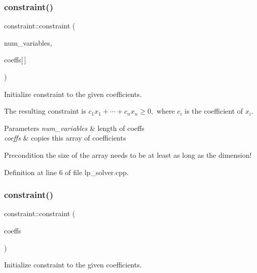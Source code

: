 \subsubsection{\texorpdfstring{constraint()}{constraint()}\hspace{0.1cm}{\footnotesize\ttfamily [1/2]}}
{\footnotesize\ttfamily constraint\+::constraint (\begin{DoxyParamCaption}\item[{N\+V\+A\+R\+\_\+\+T\+Y\+PE}]{num\+\_\+variables,  }\item[{C\+O\+N\+S\+T\+R\+\_\+\+T\+Y\+PE}]{coeffs\mbox{[}$\,$\mbox{]} }\end{DoxyParamCaption})}



Initialize constraint to the given coefficients. 

The resulting constraint is $ c_1x_1 + \cdots + c_nx_n \geq 0, $ where $ c_i $ is the coefficient of $ x_i $. 
\begin{DoxyParams}{Parameters}
{\em num\+\_\+variables} & length of coeffs \\
\hline
{\em coeffs} & copies this array of coefficients \\
\hline
\end{DoxyParams}
\begin{DoxyPrecond}{Precondition}
the size of the array needs to be at least as long as the dimension! 
\end{DoxyPrecond}


Definition at line 6 of file lp\+\_\+solver.\+cpp.

\mbox{\label{classconstraint_abcf2ec568e0dcfd37c2dc150b738ad2d}} 
\subsubsection{\texorpdfstring{constraint()}{constraint()}\hspace{0.1cm}{\footnotesize\ttfamily [2/2]}}
{\footnotesize\ttfamily constraint\+::constraint (\begin{DoxyParamCaption}\item[{vector$<$ C\+O\+N\+S\+T\+R\+\_\+\+T\+Y\+PE $>$ \&}]{coeffs }\end{DoxyParamCaption})}



Initialize constraint to the given coefficients. 

